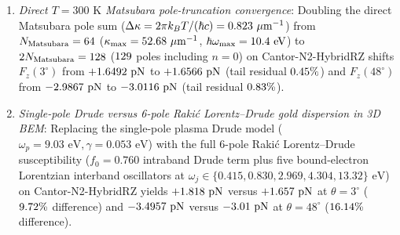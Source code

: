 \documentclass[pdflatex,sn-nature]{sn-jnl}
\DeclareRobustCommand{\roundtwo}[1]{\fpeval{round(#1,2)}}
\DeclareRobustCommand{\roundthree}[1]{\fpeval{round(#1,3)}}
\DeclareRobustCommand{\roundfour}[1]{\fpeval{round(#1,4)}}
\begin{document}
\begin{enumerate}
    \item \emph{Direct $T=300\text{ K}$ Matsubara pole-truncation convergence}: Doubling the direct Matsubara pole sum ($\Delta\kappa = 2\pi k_B T/(\hbar c) = \roundthree{\BemValMatsubaraDeltaKappaPerUm}\ \mu\text{m}^{-1}$) from $N_{\rm Matsubara} = 64{}$ ($\kappa_{\max} = \roundtwo{\BemValMatsubaraKappaCutoffPerUm}\ \mu\text{m}^{-1}$, $\hbar\omega_{\max} = \roundtwo{\BemValMatsubaraEnergyCutoffEv}\text{ eV}$) to $2N_{\rm Matsubara} = 128{}$ ($129{}$ poles including $n=0$) on Cantor-N2-HybridRZ shifts $F_z(3^\circ)$ from $+\roundfour{\BemValMatsubaraCantorThetathreeFNPn}\text{ pN}$ to $+\roundfour{\BemValMatsubaraCantorThetathreeFTwonPn}\text{ pN}$ (tail residual $\roundtwo{\BemValMatsubaraCantorThetathreeTailRelPct}\%$) and $F_z(48^\circ)$ from $\roundfour{\BemValMatsubaraCantorThetafoureightFNPn}\text{ pN}$ to $\roundfour{\BemValMatsubaraCantorThetafoureightFTwonPn}\text{ pN}$ (tail residual $\roundtwo{\BemValMatsubaraCantorThetafoureightTailRelPct}\%$).
    \item \emph{Single-pole Drude versus 6-pole Raki\'c Lorentz--Drude gold dispersion in 3D BEM}: Replacing the single-pole plasma Drude model ($\omega_p = 9.03\text{ eV}, \gamma = 0.053\text{ eV}$) with the full 6-pole Raki\'c Lorentz--Drude susceptibility ($f_0 = 0.760$ intraband Drude term plus five bound-electron Lorentzian interband oscillators at $\omega_j \in \{0.415, 0.830, 2.969, 4.304, 13.32\}\text{ eV}$)\cite{rakic1998} on Cantor-N2-HybridRZ yields $+\roundfour{\BemDispCantorNtwoRakicsixThetathreeFzPn}\text{ pN}$ versus $+\roundfour{\BemDispCantorNtwoDrudeoneThetathreeFzPn}\text{ pN}$ at $\theta=3^\circ$ ($\roundtwo{\BemDispCantorNtwoRelDiffRakicsixVsDrudeoneThetathreePct}\%$ difference) and $\roundfour{\BemDispCantorNtwoRakicsixThetafoureightFzPn}\text{ pN}$ versus $\roundfour{\BemDispCantorNtwoDrudeoneThetafoureightFzPn}\text{ pN}$ at $\theta=48^\circ$ ($\roundtwo{\BemDispCantorNtwoRelDiffRakicsixVsDrudeoneThetafoureightPct}\%$ difference).
\end{enumerate}
\end{document}
